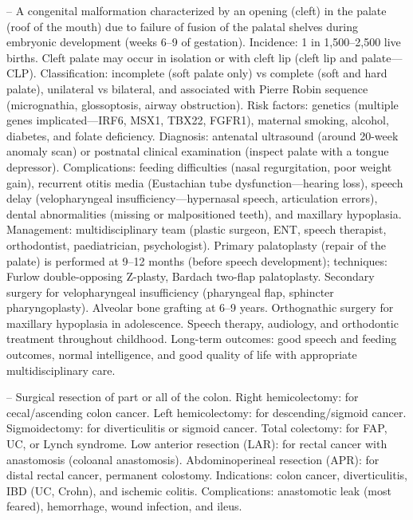 -- A congenital malformation characterized by an opening (cleft) in the palate (roof of the mouth) due to failure of fusion of the palatal shelves during embryonic development (weeks 6--9 of gestation). Incidence: 1 in 1,500--2,500 live births. Cleft palate may occur in isolation or with cleft lip (cleft lip and palate—CLP). Classification: incomplete (soft palate only) vs complete (soft and hard palate), unilateral vs bilateral, and associated with Pierre Robin sequence (micrognathia, glossoptosis, airway obstruction). Risk factors: genetics (multiple genes implicated—IRF6, MSX1, TBX22, FGFR1), maternal smoking, alcohol, diabetes, and folate deficiency. Diagnosis: antenatal ultrasound (around 20-week anomaly scan) or postnatal clinical examination (inspect palate with a tongue depressor). Complications: feeding difficulties (nasal regurgitation, poor weight gain), recurrent otitis media (Eustachian tube dysfunction—hearing loss), speech delay (velopharyngeal insufficiency—hypernasal speech, articulation errors), dental abnormalities (missing or malpositioned teeth), and maxillary hypoplasia. Management: multidisciplinary team (plastic surgeon, ENT, speech therapist, orthodontist, paediatrician, psychologist). Primary palatoplasty (repair of the palate) is performed at 9--12 months (before speech development); techniques: Furlow double-opposing Z-plasty, Bardach two-flap palatoplasty. Secondary surgery for velopharyngeal insufficiency (pharyngeal flap, sphincter pharyngoplasty). Alveolar bone grafting at 6--9 years. Orthognathic surgery for maxillary hypoplasia in adolescence. Speech therapy, audiology, and orthodontic treatment throughout childhood. Long-term outcomes: good speech and feeding outcomes, normal intelligence, and good quality of life with appropriate multidisciplinary care.

-- Surgical resection of part or all of the colon. Right hemicolectomy: for cecal/ascending colon cancer. Left hemicolectomy: for descending/sigmoid cancer. Sigmoidectomy: for diverticulitis or sigmoid cancer. Total colectomy: for FAP, UC, or Lynch syndrome. Low anterior resection (LAR): for rectal cancer with anastomosis (coloanal anastomosis). Abdominoperineal resection (APR): for distal rectal cancer, permanent colostomy. Indications: colon cancer, diverticulitis, IBD (UC, Crohn), and ischemic colitis. Complications: anastomotic leak (most feared), hemorrhage, wound infection, and ileus.

